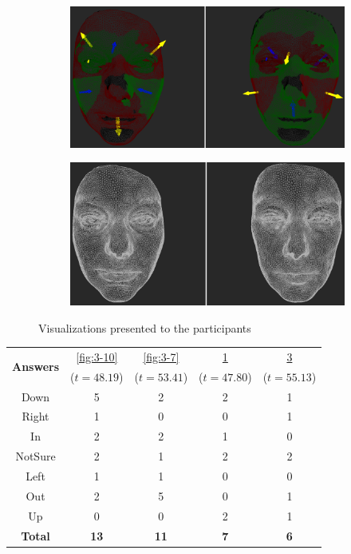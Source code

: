 \begin{figure}[h]
\begin{subfigure}{0.4\textwidth}
\includegraphics[width=\textwidth]{./screenshots/pair9.PNG}
\caption{}
\label{fig:3-9}
\end{subfigure}
\quad
\begin{subfigure}{0.4\textwidth}
\includegraphics[width=\textwidth]{./screenshots/pair6.PNG}
\caption{}
\label{fig:3-6}
\end{subfigure}
\caption{Visualizations presented to the participants}
\end{figure}
\medskip
\begin{center}
\begin{tabular}{| c | c | c | c | c |}
	\hline
\multirow{2}{*}{\bf Answers} & \ref{fig:3-10} & \ref{fig:3-7} & \ref{fig:3-9} & \ref{fig:3-6}\\
	&  (\(t=48.19\)) &  (\(t=53.41\)) &  (\(t=47.80\)) &  (\(t=55.13\))\\ \hline
	Down & 5 & 2 & 2 & 1\\ \hline
	Right & 1 & 0 & 0 & 1\\ \hline
	In & 2 & 2 & 1 & 0\\ \hline
	NotSure & 2 & 1 & 2 & 2\\ \hline
	Left & 1 & 1 & 0 & 0\\ \hline
	Out & 2 & 5 & 0 & 1\\ \hline
	Up & 0 & 0 & 2 & 1\\ \hline
	{\bf Total} & {\bf 13} & {\bf 11} & {\bf 7} & {\bf 6}\\ \hline
\end{tabular}
\end{center}
\clearpage

